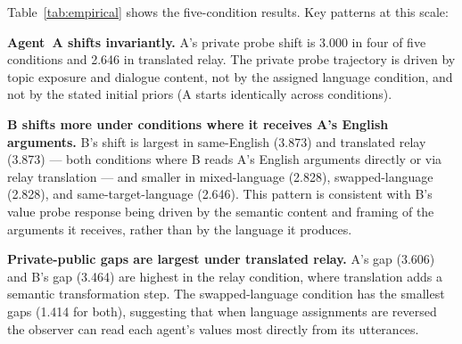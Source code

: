 \documentclass{article}
\begin{document}
\begin{table}[t]
\centering
\caption{Empirical five-condition pilot (Qwen2.5-7B-Instruct, seed 17, 4 turns, Indonesian/English). Private shift is L2 distance between initial (turn~0) and final private probe in 8-dimensional Schwartz space. Private-public gap is L2 distance between final private probe and final observer readout. All values are raw (not normalized to $[0,1]$; maximum possible L2 in 8D for values on a 1--7 scale is $\approx 16.97$).}
\label{tab:empirical}
\end{table}

Table~\ref{tab:empirical} shows the five-condition results. Key patterns at this scale:

\textbf{Agent~A shifts invariantly.} A's private probe shift is 3.000 in four of five conditions and 2.646 in translated relay. The private probe trajectory is driven by topic exposure and dialogue content, not by the assigned language condition, and not by the stated initial priors (A starts identically across conditions).

\textbf{B shifts more under conditions where it receives A's English arguments.} B's shift is largest in same-English (3.873) and translated relay (3.873) --- both conditions where B reads A's English arguments directly or via relay translation --- and smaller in mixed-language (2.828), swapped-language (2.828), and same-target-language (2.646). This pattern is consistent with B's value probe response being driven by the semantic content and framing of the arguments it receives, rather than by the language it produces.

\textbf{Private-public gaps are largest under translated relay.} A's gap (3.606) and B's gap (3.464) are highest in the relay condition, where translation adds a semantic transformation step. The swapped-language condition has the smallest gaps (1.414 for both), suggesting that when language assignments are reversed the observer can read each agent's values most directly from its utterances.
\end{document}
